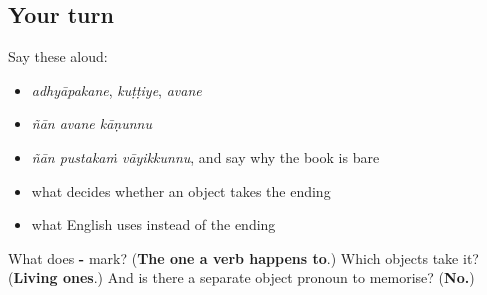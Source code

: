 \subsection*{Your turn}
Say these aloud:

\begin{itemize}
\raggedright
  \item \emph{adhyāpakane}, \emph{kuṭṭiye}, \emph{avane}
  \item \emph{ñān avane kāṇunnu}
  \item \emph{ñān pustakaṁ vāyikkunnu}, and say why the book is bare
  \item what decides whether an object takes the ending
  \item what English uses instead of the ending
\end{itemize}

\begin{tcolorbox}[breakable,colback=teal!4,colframe=teal!35!black,title={Before you move on}]
What does \textbf{-} mark? (\textbf{The one a verb happens to}.) Which objects take it? (\textbf{Living ones}.) And is there a separate object pronoun to memorise? (\textbf{No.})
\end{tcolorbox}
